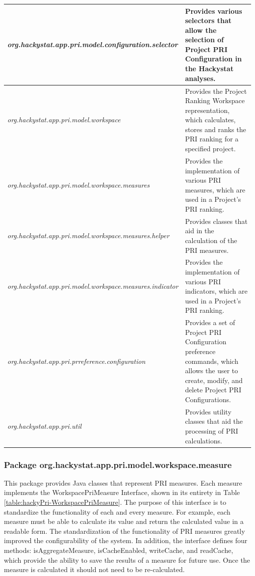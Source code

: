 \begin{table}[htbp]
\begin{center}
\begin{tabular}{|p{8.0cm}|p{7.0cm}|}
\small{}\emph{org.hackystat.app.pri.model.configuration.selector} &
\small{}Provides various selectors that allow the selection of Project PRI
Configuration in the Hackystat analyses. \\ \hline

\small{}\emph{org.hackystat.app.pri.model.workspace} & \small{}Provides the
Project Ranking Workspace representation, which calculates, stores and
ranks the PRI ranking for a specified project. \\ \hline

\small{}\emph{org.hackystat.app.pri.model.workspace.measures} &
\small{}Provides the implementation of various PRI measures, which are used
in a Project's PRI ranking. \\ \hline

\small{}\emph{org.hackystat.app.pri.model.workspace.measures.helper} &
\small{}Provides classes that aid in the calculation of the PRI
measures. \\ \hline  

\small{}\emph{org.hackystat.app.pri.model.workspace.measures.indicator} &
\small{}Provides the implementation of various PRI indicators, which are
used in a Project's PRI ranking. \\ \hline

\small{}\emph{org.hackystat.app.pri.prreference.configuration} &
\small{}Provides a set of Project PRI Configuration preference commands,
which allows the user to create, modify, and delete Project PRI
Configurations. \\ \hline 

\small{}\emph{org.hackystat.app.pri.util} & \small{}Provides utility
classes that aid the processing of PRI calculations. \\ \hline

    \end{tabular}
  \end{center}
\end{table}



\subsubsection{Package org.hackystat.app.pri.model.workspace.measure}
\label{subsubsection:measurepackage}
This package provides Java classes that represent PRI measures. Each
measure implements the WorkspacePriMeasure Interface, shown in its entirety
in Table \ref{table:hackyPri-WorkspacePriMeasure}. The purpose of this
interface is to standardize the functionality of each and every measure.
For example, each measure must be able to calculate its value and return
the calculated value in a readable form. The standardization of the
functionality of PRI measures greatly improved the configurability of the
system. In addition, the interface defines four methods:
isAggregateMeasure, isCacheEnabled, writeCache, and readCache, which
provide the ability to save the results of a measure for future use. Once
the measure is calculated it should not need to be re-calculated.

